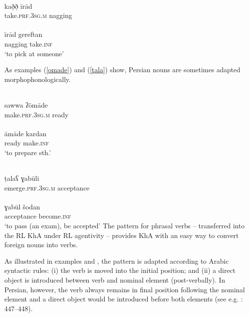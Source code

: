 \documentclass[output=paper,nonflat]{langsci/langscibook}
\begin{document}
\ea\label{ex:key:} \label{irad}
\\
\gll kað̣ð̣ īrād\\
     take.\textsc{prf}.3\textsc{sg}.\textsc{m} nagging\\ 
\\
\gll īrād gereftan\\
     nagging take.\textsc{inf}\\
\glt ‘to pick at someone’ 
\z\z

 As examples (\ref{omade}) and (\ref{tala}) show, Persian nouns are sometimes adapted morphophonologically.

\ea\label{ex:key:} \label{omade}
\\
\gll sawwa ʔōmāde\\
     make.\textsc{prf}.3\textsc{sg}.\textsc{m} ready\\ 
\\
\gll āmāde kardan \\
     ready make.\textsc{inf}\\
\glt ‘to prepare sth.’
\z\z

\ea\label{ex:key:} \label{tala}
\\
\gll ṭalaʕ ɣabūli\footnotemark \\
     emerge.\textsc{prf}.3\textsc{sg}.\textsc{m} acceptance\\
\\
\gll ɣabūl šodan\\
     acceptance become.\textsc{inf} \\
\glt ‘to pass (an exam), be accepted’
\z\z
{}
The pattern for phrasal verbs – transferred into the RL KhA under RL agentivity – provides KhA with an easy way to convert foreign nouns into verbs.

As illustrated in examples  and , the pattern is adapted according to Arabic syntactic rules: (i) the verb is moved into the initial position; and (ii) a direct object is introduced between verb and nominal element (post-verbally). In Persian, however, the verb always remains in final position following the nominal element and a direct object would be introduced before both elements (see e.g. \citealt{Majidi1990}: 447–448).
\end{document}
